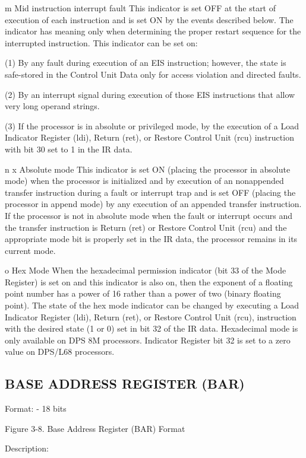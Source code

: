 m Mid instruction interrupt fault This indicator is set OFF at the start of execution of each instruction and is set ON by the events described below. The indicator has meaning only when determining the proper restart sequence for the interrupted instruction. This indicator can be set on:

(1) By any fault during execution of an EIS instruction; however, the state is
safe-stored in the Control Unit Data only for access violation and directed
faults.

(2) By an interrupt signal during execution of those EIS instructions that
allow very long operand strings.

(3) If the processor is in absolute or privileged mode, by the execution of a Load Indicator Register (ldi), Return (ret), or Restore Control Unit (rcu) instruction with bit 30 set to 1 in the IR data.

n x Absolute mode This indicator is set ON (placing the processor in absolute
mode) when the processor is initialized and by execution of an nonappended
transfer instruction during a fault or interrupt trap and is set OFF (placing
the processor in append mode) by any execution of an appended transfer
instruction. If the processor is not in absolute mode when the fault or
interrupt occurs and the transfer instruction is Return (ret) or Restore
Control Unit (rcu) and the appropriate mode bit is properly set in the IR data,
the processor remains in its current mode.

o Hex Mode When the hexadecimal permission indicator (bit 33 of the Mode Register) is set on and this indicator is also on, then the exponent of a floating point number has a power of 16 rather than a power of two (binary floating point). The state of the hex mode indicator can be changed by executing a Load Indicator Register (ldi), Return (ret), or Restore Control Unit (rcu), instruction with the desired state (1 or 0) set in bit 32 of the IR data.  Hexadecimal mode is only available on DPS 8M processors. Indicator Register bit 32 is set to a zero value on DPS/L68 processors.

\subsection{BASE ADDRESS REGISTER (BAR)}

Format: - 18 bits

Figure 3-8. Base Address Register (BAR) Format

Description:


